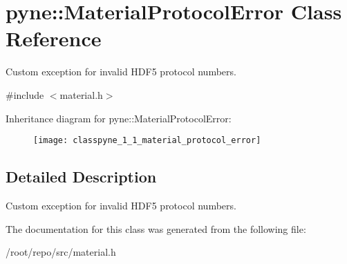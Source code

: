 \hypertarget{classpyne_1_1_material_protocol_error}{}\section{pyne\+:\+:Material\+Protocol\+Error Class Reference}
\label{classpyne_1_1_material_protocol_error}


Custom exception for invalid H\+D\+F5 protocol numbers.  




{\ttfamily \#include $<$material.\+h$>$}

Inheritance diagram for pyne\+:\+:Material\+Protocol\+Error\+:\begin{figure}[H]
\begin{center}
\leavevmode
\texttt{[image: classpyne\_1\_1\_material\_protocol\_error]}
\end{center}
\end{figure}


\subsection{Detailed Description}
Custom exception for invalid H\+D\+F5 protocol numbers. 

The documentation for this class was generated from the following file\+:\begin{DoxyCompactItemize}
\item 
/root/repo/src/material.\+h\end{DoxyCompactItemize}
